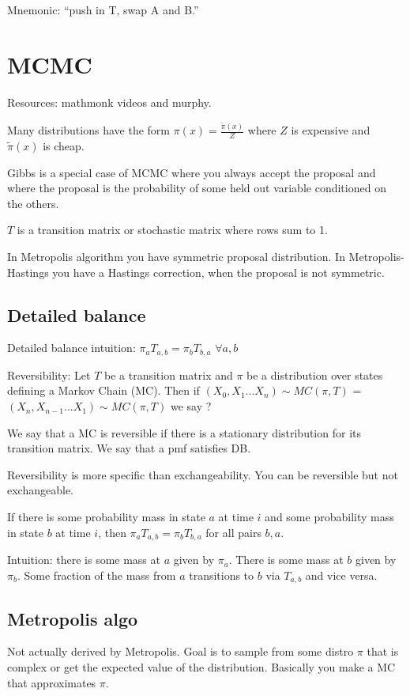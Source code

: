 \documentclass[12pt]{amsart}
\begin{document}
Mnemonic: ``push in T, swap A and B.'' 



\section{MCMC}

Resources: mathmonk videos and murphy.

Many distributions have the form $\pi(x) = \frac{\widetilde{\pi}(x)}{Z}$ where $Z$ is expensive and $\widetilde{\pi}(x)$ is cheap.

Gibbs is a special case of MCMC where you always accept the proposal and where the proposal is the probability of some held out variable conditioned on the others.

$T$ is a transition matrix or stochastic matrix where rows sum to 1.

In Metropolis algorithm you have symmetric proposal distribution. In Metropolis-Hastings you have a Hastings correction, when the proposal is not symmetric. 

\subsection{Detailed balance}

Detailed balance intuition: $\pi_a T_{a,b} = \pi_b T_{b,a}$ $\forall a,b$

Reversibility:  Let $T$ be a transition matrix and $\pi$ be a distribution over states defining a Markov Chain (MC). Then if $(X_0, X_1 ... X_n) \sim MC(\pi, T)$ = $(X_n, X_{n -1} ... X_1) \sim MC(\pi, T)$ we say ? 

We say that a MC is reversible if there is a stationary distribution for its transition matrix. We say that a pmf satisfies DB. 

Reversibility is more specific than exchangeability. You can be reversible but not exchangeable. 

If there is some probability mass in state $a$ at time $i$ and some probability mass in state $b$ at time $i$, then $\pi_a T_{a,b} = \pi_b T_{b,a}$ for all pairs $b,a$.

Intuition: there is some mass at $a$ given by $\pi_a$. There is some mass at $b$ given by $\pi_b$. Some fraction of the mass from $a$ transitions to $b$ via $T_{a,b}$ and vice versa. 

\subsection{Metropolis algo}
Not actually derived by Metropolis. Goal is to sample from some distro $\pi$ that is complex or get the expected value of the distribution. Basically you make a MC that approximates $\pi$. 
\end{document}
